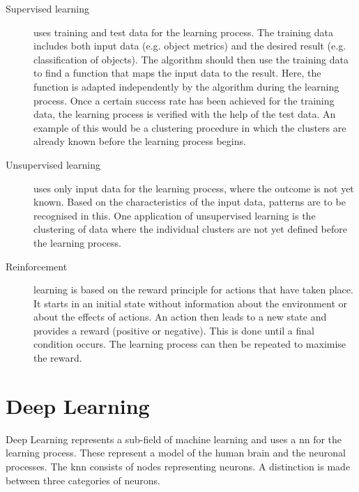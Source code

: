 \begin{description}
    \item[Supervised learning] uses training and test data for the learning process. The training data includes both input data (e.g. object metrics) and the desired result (e.g. classification of objects). The algorithm should then use the training data to find a function that maps the input data to the result. Here, the function is adapted independently by the algorithm during the learning process. Once a certain success rate has been achieved for the training data, the learning process is verified with the help of the test data. An example of this would be a clustering procedure in which the clusters are already known before the learning process begins. 
    
    \item[Unsupervised learning] uses only input data for the learning process, where the outcome is not yet known. Based on the characteristics of the input data, patterns are to be recognised in this. One application of unsupervised learning is the clustering of data where the individual clusters are not yet defined before the learning process. 
    
    \item[Reinforcement] learning is based on the reward principle for actions that have taken place. It starts in an initial state without information about the environment or about the effects of actions. An action then leads to a new state and provides a reward (positive or negative). This is done until a final condition occurs. The learning process can then be repeated to maximise the reward. 
\end{description}

\section{Deep Learning}
 
 Deep Learning represents a sub-field of machine learning and uses a \ac{nn} for the learning process. These represent a model of the human brain and the neuronal processes. The \ac{knn} consists of nodes representing neurons. A distinction is made between three categories of neurons. 
 


